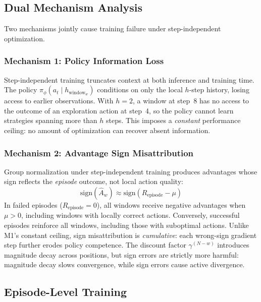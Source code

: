 \subsection{Dual Mechanism Analysis}
\label{sec:dual_mechanism}

Two mechanisms jointly cause training failure under step-independent optimization.

\subsubsection{Mechanism 1: Policy Information Loss}
\label{sec:m1_information_loss}

Step-independent training truncates context at both inference and training time. The policy $\pi_\phi(a_t \mid h_{\text{window}_w})$ conditions on only the local $h$-step history, losing access to earlier observations. With $h{=}2$, a window at step~8 has no access to the outcome of an exploration action at step~4, so the policy cannot learn strategies spanning more than $h$ steps. This imposes a \textit{constant} performance ceiling: no amount of optimization can recover absent information.

\subsubsection{Mechanism 2: Advantage Sign Misattribution}
\label{sec:m2_sign_misattribution}

Group normalization under step-independent training produces advantages whose sign reflects the \textit{episode} outcome, not local action quality:
\begin{equation}
\text{sign}(\hat{A}_w) \approx \text{sign}(R_{\text{episode}} - \mu)
\label{eq:sign_correlation}
\end{equation}
In failed episodes ($R_{\text{episode}} = 0$), all windows receive negative advantages when $\mu > 0$, including windows with locally correct actions. Conversely, successful episodes reinforce all windows, including those with suboptimal actions. Unlike M1's constant ceiling, sign misattribution is \textit{cumulative}: each wrong-sign gradient step further erodes policy competence. The discount factor $\gamma^{(N-w)}$ introduces magnitude decay across positions, but sign errors are strictly more harmful: magnitude decay slows convergence, while sign errors cause active divergence.

\subsection{Episode-Level Training}
\label{sec:episode_level}


